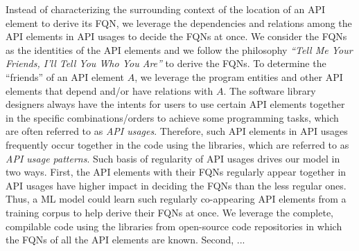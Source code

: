 Instead of characterizing the surrounding context of the location of
an API element to derive its FQN, we leverage the dependencies and
relations among the API elements in API usages to decide the FQNs at
once. We consider the FQNs as the identities of the API elements and
we follow the philosophy {\em ``Tell Me Your Friends, I'll Tell You
  Who You Are''} to derive the FQNs. To determine the ``friends'' of
an API element $A$, we leverage the program entities and other API
elements that depend and/or have relations with $A$. The software
library designers always have the intents for users to use certain API
elements together in the specific combinations/orders to achieve some
programming tasks, which are often referred to as {\em API
  usages}. Therefore, such API elements in API usages frequently occur
together in the code using the libraries, which are referred to as
{\em API usage patterns}. Such basis of regularity of API usages
drives our model in two ways. First, the API elements with their FQNs
regularly appear together in API usages have higher impact in deciding
the FQNs than the less regular ones. Thus, a ML model could learn such
regularly co-appearing API elements from a training corpus to help
derive their FQNs at once. We leverage the complete, compilable code
using the libraries from open-source code repositories in which the
FQNs of all the API elements are known. Second, ...
